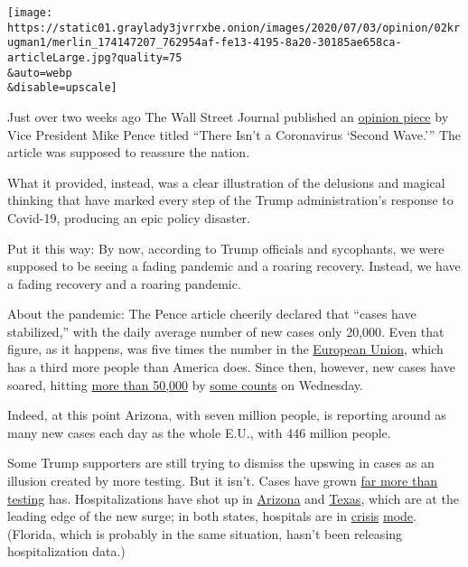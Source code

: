 \texttt{[image: https://static01.graylady3jvrrxbe.onion/images/2020/07/03/opinion/02krugman1/merlin\_174147207\_762954af-fe13-4195-8a20-30185ae658ca-articleLarge.jpg?quality=75\\\&auto=webp\\\&disable=upscale]}

Just over two weeks ago The Wall Street Journal published an
\href{https://www.wsj.com/articles/there-isnt-a-coronavirus-second-wave-11592327890}{opinion
piece} by Vice President Mike Pence titled ``There Isn't a Coronavirus
`Second Wave.''' The article was supposed to reassure the nation.

What it provided, instead, was a clear illustration of the delusions and
magical thinking that have marked every step of the Trump
administration's response to Covid-19, producing an epic policy
disaster.

Put it this way: By now, according to Trump officials and sycophants, we
were supposed to be seeing a fading pandemic and a roaring recovery.
Instead, we have a fading recovery and a roaring pandemic.

About the pandemic: The Pence article cheerily declared that ``cases
have stabilized,'' with the daily average number of new cases only
20,000. Even that figure, as it happens, was five times the number in
the
\href{https://ourworldindata.org/coronavirus-data-explorer?zoomToSelection=true\&casesMetric=true\&dailyFreq=true\&smoothing=7\&country=USA~EuropeanUnion\&pickerMetric=location\&pickerSort=asc}{European
Union}, which has a third more people than America does. Since then,
however, new cases have soared, hitting
\href{https://covidtracking.com/data}{more than 50,000} by
\href{https://www.nytimes3xbfgragh.onion/interactive/2020/us/coronavirus-us-cases.html}{some
counts} on Wednesday.

Indeed, at this point Arizona, with seven million people, is reporting
around as many new cases each day as the whole E.U., with 446 million
people.

Some Trump supporters are still trying to dismiss the upswing in cases
as an illusion created by more testing. But it isn't. Cases have grown
\href{https://covidtracking.com/data}{far more than testing} has.
Hospitalizations have shot up in
\href{https://covidtracking.com/data/state/arizona}{Arizona} and
\href{https://covidtracking.com/data/state/texas}{Texas}, which are at
the leading edge of the new surge; in both states, hospitals are in
\href{https://abcnews.go.com/US/leaving-hospital-tears-arizona-doctors-worry-icus-fill/story?id=71519097}{crisis}
\href{https://www.propublica.org/article/internal-messages-reveal-crisis-at-houston-hospitals-as-coronavirus-cases-surge}{mode}.
(Florida, which is probably in the same situation, hasn't been releasing
hospitalization data.)

